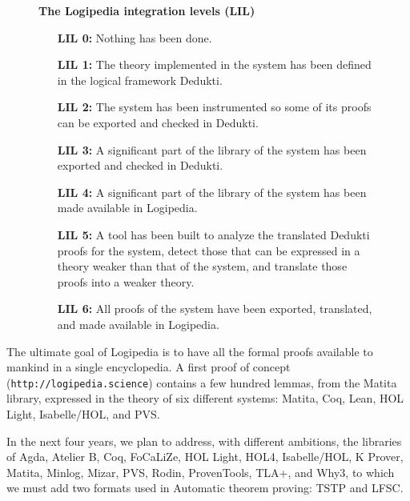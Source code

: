 \begin{figure}[ht]
\begin{shaded}
\begin{center}
{\bf \Large The Logipedia integration levels (LIL)\label{lil}}
\end{center}

\begin{itemize}
\item[\bf LIL 0:] Nothing has been done.

\item[\bf LIL 1:] The theory implemented in the system has been defined in
  the logical framework Dedukti.

\item[\bf LIL 2:] The system has been instrumented so some of its proofs
  can be exported and checked in Dedukti.

\item[\bf LIL 3:] A significant part of the library of the system has been
  exported and checked in Dedukti.

\item[\bf LIL 4:] A significant part of the library of the system has
  been made available in Logipedia.

\item[\bf LIL 5:] A tool has been built to analyze the translated Dedukti proofs
  for the system, detect those that can be expressed in a theory
  weaker than that of the system, and translate those proofs into a
  weaker theory.

\item[\bf LIL 6:] All proofs of the system have been exported, translated,
  and made available in Logipedia.
\end{itemize}
\end{shaded}
\end{figure}

The ultimate goal of Logipedia is to have all the formal proofs
available to mankind in a single encyclopedia.  A first proof of
concept ({\tt http://logipedia.science}) contains a few hundred
lemmas, from the Matita library, expressed in the theory of six
different systems: Matita, Coq, Lean, HOL Light, Isabelle/HOL, and
PVS.

In the next four years, we plan to address, with different ambitions,
the libraries of Agda, Atelier B, Coq, FoCaLiZe, HOL Light, HOL4,
Isabelle/HOL, K Prover, Matita, Minlog, Mizar, PVS, Rodin,
ProvenTools, TLA+, and Why3, to which we must add two formats used in
Automatic theorem proving: TSTP and LFSC.

